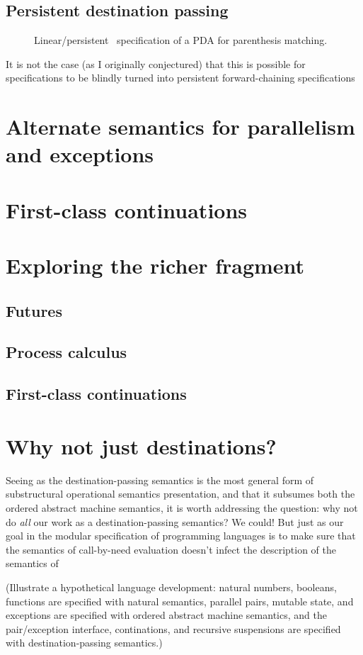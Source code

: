 \subsection{Persistent destination passing}

\begin{figure}
\caption{Linear/persistent \sls~specification of a PDA for parenthesis
  matching.}
\label{fig:pda-pers}
\end{figure}

It is not the case (as I originally conjectured) that this is possible
for specifications to be blindly turned into persistent forward-chaining
specifications 

\section{Alternate semantics for parallelism and exceptions}
\label{sec:modular-parallelism}

\section{First-class continuations}

\section{Exploring the richer fragment}

\subsection{Futures}

\subsection{Process calculus}

\subsection{First-class continuations}

\section{Why not just destinations?}

Seeing as the destination-passing semantics is the most general form
of substructural operational semantics presentation, and that it
subsumes both the ordered abstract machine semantics, it is worth
addressing the question: why not do {\it all} our work as a
destination-passing semantics? We could! But just as our goal in the
modular specification of programming languages is to make sure that
the semantics of call-by-need evaluation doesn't infect the
description of the semantics of

(Illustrate a hypothetical language development: natural numbers,
booleans, functions are specified with natural semantics, parallel
pairs, mutable state, and exceptions are specified with ordered
abstract machine semantics, and the pair/exception interface,
continations, and recursive suspensions are specified with
destination-passing semantics.)

